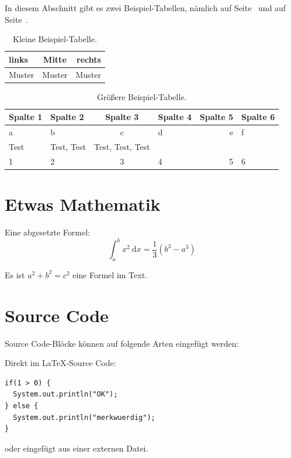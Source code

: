 In diesem Abschnitt gibt es zwei Beispiel-Tabellen, nämlich auf Seite~\pageref{tab:BeispielTabelleKlein} und auf Seite~\pageref{tab:BeispielTabelleGroesser}.

\begin{table}[htb]
\centering
\begin{tabular}{lcr}
links & Mitte & rechts \\
\hline
Muster & Muster & Muster \\
\end{tabular}
\caption{Kleine Beispiel-Tabelle.}
\label{tab:BeispielTabelleKlein}
\end{table}

\begin{table}[htb]
\centering
\begin{tabular}{|l|l|c|l|r||l}
    \textbf{Spalte 1} & \textbf{Spalte 2} & \textbf{Spalte 3} & \textbf{Spalte 4} & \textbf{Spalte 5} & \textbf{Spalte 6} \\
    \hline
    a        & b          & c                & d        & e        & f        \\
    Test     & Test, Test & Test, Test, Test & ~        & ~        & ~        \\
    1        & 2          & 3                & 4        & 5        & 6        \\
\end{tabular}
\caption{Größere Beispiel-Tabelle.}
\label{tab:BeispielTabelleGroesser}
\end{table}

\section{Etwas Mathematik}

Eine abgesetzte Formel:
\[
  \int_a^b x^2 \: \mathrm{d} x = \frac{1}{3} (b^3 - a^3)
\]

Es ist $a^2+b^2 = c^2$ eine Formel im Text.

\section{Source Code}

Source Code-Blöcke können auf folgende Arten eingefügt werden:

\lstset{language=Java}

Direkt im \LaTeX-Source Code:
\begin{lstlisting}
if(1 > 0) {
  System.out.println("OK"); 
} else {
  System.out.println("merkwuerdig");
}
\end{lstlisting}

oder eingefügt aus einer externen Datei.
